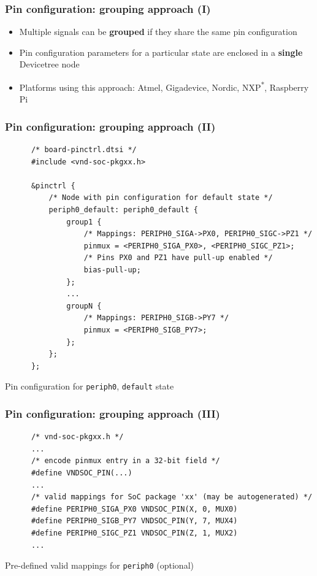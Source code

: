 \documentclass[handout]{beamer}
\begin{document}
\begin{frame}
  \frametitle{Pin configuration: grouping approach (I)}

  \begin{itemize}
    \item<1-> Multiple signals can be \textbf{grouped} if they share the same
          pin configuration
    \item<2-> Pin configuration parameters for a particular state are enclosed
          in a \textbf{single} Devicetree node
    \item<3-> Platforms using this approach: Atmel, Gigadevice, Nordic,
          NXP\textsuperscript{*}, Raspberry Pi
  \end{itemize}
\end{frame}

\begin{frame}[fragile]
  \frametitle{Pin configuration: grouping approach (II)}

  \begin{listing}[H]
    \begin{verbatim}
      /* board-pinctrl.dtsi */
      #include <vnd-soc-pkgxx.h>
  
      &pinctrl {
          /* Node with pin configuration for default state */
          periph0_default: periph0_default {
              group1 {
                  /* Mappings: PERIPH0_SIGA->PX0, PERIPH0_SIGC->PZ1 */
                  pinmux = <PERIPH0_SIGA_PX0>, <PERIPH0_SIGC_PZ1>;
                  /* Pins PX0 and PZ1 have pull-up enabled */
                  bias-pull-up;
              };
              ...
              groupN {
                  /* Mappings: PERIPH0_SIGB->PY7 */
                  pinmux = <PERIPH0_SIGB_PY7>;
              };
          };
      };
    \end{verbatim}
    \caption{Pin configuration for \texttt{periph0}, \texttt{default} state}
  \end{listing}
\end{frame}

\begin{frame}[fragile]
  \frametitle{Pin configuration: grouping approach (III)}

  \begin{listing}[H]
    \begin{verbatim}
      /* vnd-soc-pkgxx.h */
      ...
      /* encode pinmux entry in a 32-bit field */
      #define VNDSOC_PIN(...)
      ...
      /* valid mappings for SoC package 'xx' (may be autogenerated) */
      #define PERIPH0_SIGA_PX0 VNDSOC_PIN(X, 0, MUX0)
      #define PERIPH0_SIGB_PY7 VNDSOC_PIN(Y, 7, MUX4)
      #define PERIPH0_SIGC_PZ1 VNDSOC_PIN(Z, 1, MUX2)
      ...
    \end{verbatim}
    \caption{Pre-defined valid mappings for \texttt{periph0} (optional)}
  \end{listing}
\end{frame}
\end{document}
